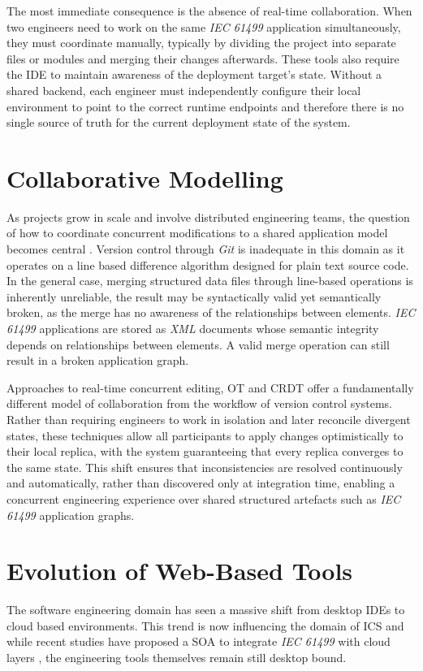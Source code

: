 The most immediate consequence is the absence of real-time collaboration. When two engineers need to work on the same \textit{IEC 61499} application simultaneously, they must coordinate manually, typically by dividing the project into separate files or modules and merging their changes afterwards. These tools also require the \ac{IDE} to maintain awareness of the deployment target's state. Without a shared backend, each engineer must independently configure their local environment to point to the correct runtime endpoints and therefore there is no single source of truth for the current deployment state of the system.

\section{Collaborative Modelling}
As projects grow in scale and involve distributed engineering teams, the question of how to coordinate concurrent modifications to a shared application model becomes central \cite{seidl_collaborative_2018}. Version control through \textit{Git} is inadequate in this domain as it operates on a line based difference algorithm designed for plain text source code. In the general case, merging structured data files through line-based operations is inherently unreliable, the result may be syntactically valid yet semantically broken, as the merge has no awareness of the relationships between elements. \textit{IEC 61499} applications are stored as \textit{XML} documents whose semantic integrity depends on relationships between elements. A valid merge operation can still result in a broken application graph.

Approaches to real-time concurrent editing, \ac{OT} and \ac{CRDT} offer a fundamentally different model of collaboration from the workflow of version control systems. Rather than requiring engineers to work in isolation and later reconcile divergent states, these techniques allow all participants to apply changes optimistically to their local replica, with the system guaranteeing that every replica converges to the same state. This shift ensures that inconsistencies are resolved continuously and automatically, rather than discovered only at integration time, enabling a concurrent engineering experience over shared structured artefacts such as \textit{IEC 61499} application graphs.

\section{Evolution of Web-Based Tools}
The software engineering domain has seen a massive shift from desktop \acp{IDE} to cloud based environments. This trend is now influencing the domain of \ac{ICS} and while recent studies have proposed a \ac{SOA} to integrate \textit{IEC 61499} with cloud layers \cite{torres_literature_2025}, the engineering tools themselves remain still desktop bound.


